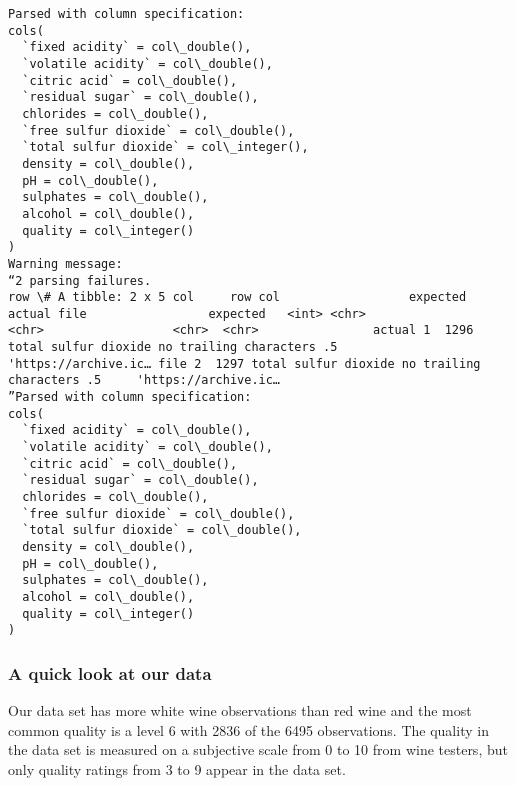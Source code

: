 \documentclass[11pt]{article}
\begin{document}
    \begin{Verbatim}[commandchars=\\\{\}]
Parsed with column specification:
cols(
  `fixed acidity` = col\_double(),
  `volatile acidity` = col\_double(),
  `citric acid` = col\_double(),
  `residual sugar` = col\_double(),
  chlorides = col\_double(),
  `free sulfur dioxide` = col\_double(),
  `total sulfur dioxide` = col\_integer(),
  density = col\_double(),
  pH = col\_double(),
  sulphates = col\_double(),
  alcohol = col\_double(),
  quality = col\_integer()
)
Warning message:
“2 parsing failures.
row \# A tibble: 2 x 5 col     row col                  expected               actual file                 expected   <int> <chr>                <chr>                  <chr>  <chr>                actual 1  1296 total sulfur dioxide no trailing characters .5     'https://archive.ic… file 2  1297 total sulfur dioxide no trailing characters .5     'https://archive.ic…
”Parsed with column specification:
cols(
  `fixed acidity` = col\_double(),
  `volatile acidity` = col\_double(),
  `citric acid` = col\_double(),
  `residual sugar` = col\_double(),
  chlorides = col\_double(),
  `free sulfur dioxide` = col\_double(),
  `total sulfur dioxide` = col\_double(),
  density = col\_double(),
  pH = col\_double(),
  sulphates = col\_double(),
  alcohol = col\_double(),
  quality = col\_integer()
)

    \end{Verbatim}

    \hypertarget{a-quick-look-at-our-data}{%
\subsubsection{A quick look at our
data}\label{a-quick-look-at-our-data}}

Our data set has more white wine observations than red wine and the most
common quality is a level 6 with 2836 of the 6495 observations. The
quality in the data set is measured on a subjective scale from 0 to 10
from wine testers, but only quality ratings from 3 to 9 appear in the
data set.
\end{document}
